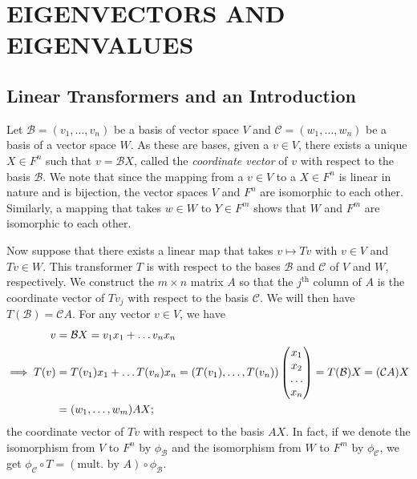 \documentclass[15pt,a4paper]{book}
\theoremstyle{definition}
\newcommand{\eax}[1]{\emph{#1}\index{#1}} %
\newcommand{\mc}[1]{\mathcal{#1}}
\begin{document}
\chapter{EIGENVECTORS AND EIGENVALUES}

\section{Linear Transformers and an Introduction}
Let $\mc{B} = (v_{1},\ldots,v_{n})$ be a basis of vector space $V$ and $\mc{C} = (w_{1},\ldots,w_{n})$ be a basis of a vector space $W$. As these are bases, given a $v \in V$, there exists a unique $X \in F^{n}$ such that $v = \mc{B}X$, called the \eax{coordinate vector} of $v$ with respect to the basis $\mc{B}$. We note that since the mapping from a $v \in V$ to a $X \in F^{n}$ is linear in nature and is bijection, the vector spaces $V$ and $F^{n}$ are isomorphic to each other. Similarly, a mapping that takes $w \in W$ to $Y \in F^{m}$ shows that $W$ and $F^{m}$ are isomorphic to each other. 

Now suppose that there exists a linear map that takes $v \mapsto Tv$ with $v \in V$ and $Tv \in W$. This transformer $T$ is with respect to the bases $\mc{B}$ and $\mc{C}$ of $V$ and $W$, respectively. We construct the $m \times n$ matrix $A$ so that the $j^{\text{th}}$ column of $A$ is the coordinate vector of $Tv_{j}$ with respect to the basis $\mc{C}$. We will then have $T(\mc{B}) = \mc{C}A$. For any vector $v \in V$, we have
\begin{align}
    v &= \mc{B}X = v_{1}x_{1}+ \ldots v_{n}x_{n} \notag \\
    \implies T(v) &= T(v_{1})x_{1} + \ldots T(v_{n})x_{n} = (T(v_{1}),\ldots,T(v_{n})) \begin{pmatrix}
        x_{1} \\ x_{2} \\ \ldots \\ x_{n}
    \end{pmatrix} = T(\mc{B})X = (\mc{C}A) X \\
    &= (w_{1},\ldots,w_{m}) AX;
\end{align}
the coordinate vector of $Tv$ with respect to the basis $AX$. In fact, if we denote the isomorphism from $V$ to $F^{n}$ by $\phi_{\mc{B}}$ and the isomorphism from $W$ to $F^{m}$ by $\phi_{\mc{C}}$, we get $\phi_{\mc{C}} \circ T = (\text{mult. by $A$}) \circ \phi_{\mc{B}}$.
\end{document}
